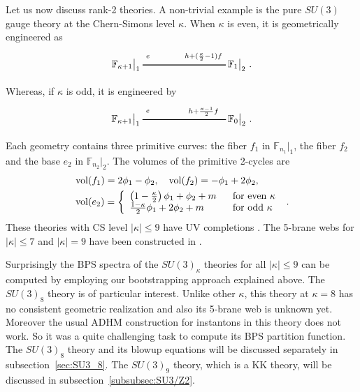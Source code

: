 Let us now discuss rank-2 theories. A non-trivial example is the pure $SU(3)$ gauge theory at the Chern-Simons level $ \kappa $. When $ \kappa $ is even, it is geometrically engineered as
\begin{align}\label{eq:su3_even_geo}
\begin{tikzpicture}
\draw[thick](-3,0)--(0,0);	
\node at(-3.6,0) {$\mathbb{F}_{\kappa+1}{}\big|_1$};
\node at(-2.8,0.3) {${}_e$};
\node at(0.5,0) {$\mathbb{F}_{1}{}\big|_2$\ .};
\node at(-0.8,0.3) {${}_{h+(\frac{\kappa}{2}-1)f}$};
\end{tikzpicture}
\end{align}
Whereas, if $\kappa$ is odd, it is engineered by
\begin{align}\label{eq:su3_odd_geo}
\begin{tikzpicture}
\draw[thick](-3,0)--(0,0);	
\node at(-3.6,0) {$\mathbb{F}_{\kappa+1}{}\big|_1$};
\node at(-2.8,0.3) {${}_e$};
\node at(0.5,0) {$\mathbb{F}_{0}{}\big|_2$\ .};
\node at(-0.8,0.3) {${}_{h+\frac{\kappa-1}{2}f}$};
\end{tikzpicture}
\end{align}
Each geometry contains three primitive curves: the fiber $f_1$ in $\mathbb{F}_{n_1}|_1$, the fiber $f_2$ and the base $e_2$ in $\mathbb{F}_{n_2}|_2$.
The volumes of the primitive 2-cycles are
\begin{align}
&\vol(f_1) = 2\phi_1 - \phi_2, \quad
\vol(f_2) = -\phi_1 + 2\phi_2, \nonumber\\
&\vol(e_2) = \left\{ \begin{array}{ll} \left(1-\tfrac{\kappa}{2}\right)\phi_1+\phi_2 + m& \ \ {\rm for \ even}\ \kappa \\
	\frac{1-\kappa}{2}\phi_1+2\phi_2 + m & \ \ {\rm for \ odd}\ \kappa 
	\end{array}\right. \ .
\end{align}
These theories with CS level $|\kappa|\le9$ have UV completions \cite{Jefferson:2018irk,Bhardwaj:2019jtr}. The 5-brane webs for $|\kappa|\le 7$ and $|\kappa|=9$ have been constructed in \cite{Hayashi:2018lyv}. 

Surprisingly the BPS spectra of the  $SU(3)_\kappa$ theories for all $|\kappa|\le 9$ can be computed by employing our bootstrapping approach explained above. The $SU(3)_8$ theory is of particular interest. Unlike other $\kappa$, this theory at $\kappa=8$ has no consistent geometric realization \cite{Jefferson:2018irk,Bhardwaj:2019jtr,Bhardwaj:2020gyu} and also its 5-brane web is unknown yet. Moreover the usual ADHM construction for instantons in this theory does not work. So it was a quite challenging task to compute its BPS partition function. The $SU(3)_8$ theory and its blowup equations will be discussed separately in subsection~\ref{sec:SU3_8}. The $SU(3)_9$ theory, which is a KK theory, will be discussed in subsection~\ref{subsubsec:SU3/Z2}.

